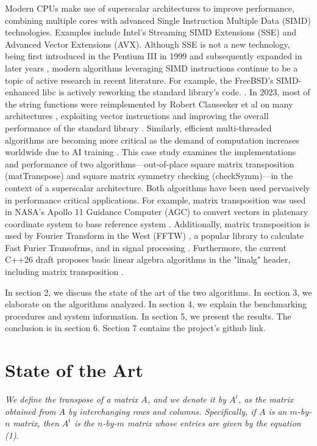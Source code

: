 \documentclass[conference]{IEEEtran}
\begin{document}
Modern CPUs make use of superscalar architectures to improve performance, combining multiple cores with advanced Single Instruction Multiple Data (SIMD) technologies. Examples include Intel's Streaming SIMD Extensions (SSE) and Advanced Vector Extensions (AVX). Although SSE is not a new technology, being first introduced in the Pentium III in 1999 and subsequently expanded in later years \cite{b1}, modern algorithms leveraging SIMD instructions continue to be a topic of active research in recent literature.
For example, the FreeBSD's SIMD-enhanced libc is actively reworking the standard library's code. \cite{b2}.
In 2023, most of the string functions were reimplemented by Robert Clausecker et al on many architectures \cite{b3}, exploiting vector instructions and improving the overall performance of the standard library \cite{b4}.
Similarly, efficient multi-threaded algorithms are becoming more critical as the demand of computation increases worldwide due to AI training \cite{b5} \cite{b6}.
This case study examines the implementations and performance of two algorithms—out-of-place square matrix transposition (matTranspose) and square matrix symmetry checking (checkSymm)—in the context of a superscalar architecture. Both algorithms have been used pervasively in performance critical applications. For example, matrix transposition was used in NASA's Apollo 11 Guidance Computer (AGC) to convert vectors in platenary coordinate system to base reference system \cite{b7}. Additionally, matrix transposition is used by Fourier Transform in the West (FFTW) \cite{b8}, a popular library to calculate Fast Furier Transofrms, and in signal processing \cite{b9}. Furthermore, the current C++26 draft proposes basic linear algebra algorithms in the "linalg" header, including matrix transposition \cite{b10}.

In section 2, we discuss the state of the art of the two algorithms.
In section 3, we elaborate on the algorithms analyzed.
In section 4, we explain the benchmarking procedures and system information.
In section 5, we present the results. The conclusion is in section 6. Section 7 contains
the project's github link.


\section{State of the Art}

\iffalse

\textit{We define the transpose of a matrix $A$, and we denote it by $A^t$, as the matrix obtained from $A$ by interchanging rows and columns. Specifically, if $A$ is an $m$-by-$n$ matrix, then $A^t$ is the $n$-by-$m$ matrix whose entries are given by the equation (1)}. \cite{b11}
\end{document}
